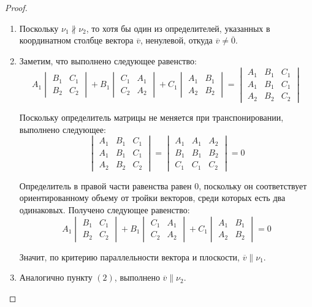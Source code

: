 \begin{proof}~
	\begin{enumerate}
		\item Поскольку $\nu_1 \nparallel \nu_2$, то хотя бы один из определителей, указанных в координатном столбце вектора $\overline{v}$, ненулевой, откуда $\overline v \ne \overline 0$.
		\item Заметим, что выполнено следующее равенство:
		\[A_1\begin{vmatrix}B_1&C_1\\B_2&C_2\end{vmatrix}+
		B_1\begin{vmatrix}C_1&A_1\\C_2&A_2\end{vmatrix}+
		C_1\begin{vmatrix}A_1&B_1\\A_2&B_2\end{vmatrix} = 
		\begin{vmatrix}A_1&B_1&C_1\\A_1&B_1&C_1\\A_2&B_2&C_2\end{vmatrix}\]
		
		Поскольку определитель матрицы не меняется при транспонировании, выполнено следующее:
		\[\begin{vmatrix}A_1&B_1&C_1\\A_1&B_1&C_1\\A_2&B_2&C_2\end{vmatrix} = \begin{vmatrix}A_1&A_1&A_2\\B_1&B_1&B_2\\C_1&C_1&C_2\end{vmatrix} = 0\]
		
		Определитель в правой части равенства равен $0$, поскольку он соответствует ориентированному объему от тройки векторов, среди которых есть два одинаковых. Получено следующее равенство:
		\[A_1\begin{vmatrix}B_1&C_1\\B_2&C_2\end{vmatrix}+
		B_1\begin{vmatrix}C_1&A_1\\C_2&A_2\end{vmatrix}+
		C_1\begin{vmatrix}A_1&B_1\\A_2&B_2\end{vmatrix} = 0\]
		
		Значит, по критерию параллельности вектора и плоскости, $\overline{v} \parallel \nu_1$.
		\item Аналогично пункту $(2)$, выполнено $\overline{v} \parallel \nu_2$.\qedhere
	\end{enumerate}
\end{proof}

